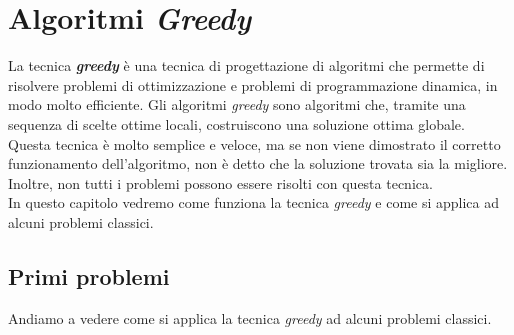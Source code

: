 \chapter{Algoritmi \textit{Greedy}}
\label{ch:greedy}

La tecnica \textit{\textbf{greedy}} è una tecnica di progettazione di algoritmi che permette di risolvere problemi di ottimizzazione e problemi di programmazione dinamica, in modo molto efficiente. Gli algoritmi \textit{greedy} sono algoritmi che, tramite una sequenza di scelte ottime locali, costruiscono una soluzione ottima globale. Questa tecnica è molto semplice e veloce, ma se non viene dimostrato il corretto funzionamento dell'algoritmo, non è detto che la soluzione trovata sia la migliore. Inoltre, non tutti i problemi possono essere risolti con questa tecnica.\\
In questo capitolo vedremo come funziona la tecnica \textit{greedy} e come si applica ad alcuni problemi classici.

\section{Primi problemi}
    Andiamo a vedere come si applica la tecnica \textit{greedy} ad alcuni problemi classici.
